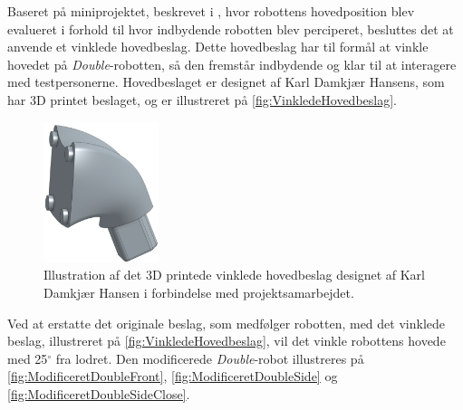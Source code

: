 Baseret på miniprojektet, beskrevet i \fullref{\MiniprojektHovedeVinkelpartname}, hvor robottens hovedposition blev evalueret i forhold til hvor indbydende robotten blev perciperet, besluttes det at anvende et vinklede hovedbeslag. Dette hovedbeslag har til formål at vinkle hovedet på \textit{Double}-robotten, så den fremstår indbydende og klar til at interagere med testpersonerne. Hovedbeslaget er designet af Karl Damkjær Hansens, som har 3D printet beslaget, og er illustreret på \autoref{fig:VinkledeHovedbeslag}.            
%
\begin{figure}[H]
\centering
\includegraphics[width = 0.3\textwidth]{Figure/TestdesignParametre/VinkledeHovedbeslag} 
\caption{Illustration af det 3D printede vinklede hovedbeslag designet af Karl Damkjær Hansen i forbindelse med projektsamarbejdet.}
\label{fig:VinkledeHovedbeslag}
\end{figure}
\noindent
%
Ved at erstatte det originale beslag, som medfølger robotten, med det vinklede beslag, illustreret på \autoref{fig:VinkledeHovedbeslag}, vil det vinkle robottens hovede med 25$^{\circ}$ fra lodret. Den modificerede \textit{Double}-robot illustreres på \autoref{fig:ModificeretDoubleFront}, \autoref{fig:ModificeretDoubleSide} og \autoref{fig:ModificeretDoubleSideClose}.
%

